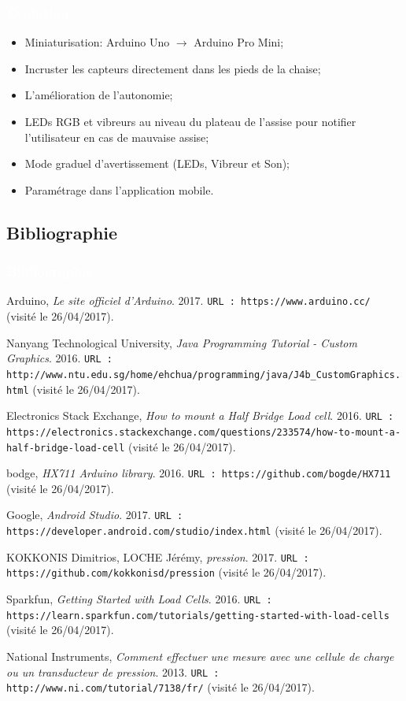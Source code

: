 \documentclass{beamer}
\begin{document}
\begin{frame}
\frametitle{\textcolor{white}{\'Evolution}}
\begin{itemize}
\item Miniaturisation: Arduino Uno $\rightarrow$ Arduino Pro Mini;
\item Incruster les capteurs directement dans les pieds de la chaise;
\item L'amélioration de l'autonomie;
\item LEDs RGB et vibreurs au niveau du plateau de l'assise pour notifier l'utilisateur en cas de mauvaise assise;
\item Mode graduel d'avertissement (LEDs, Vibreur et Son);
\item Paramétrage dans l'application mobile.
\end{itemize}
\end{frame}

\subsection*{Bibliographie}
\begin{frame}
\frametitle{\textcolor{white}{Bibliographie}}
\begin{thebibliography}{99}
{\tiny {} Arduino, \textit{Le site officiel d'Arduino}. 2017. \texttt{\tiny URL : https://www.arduino.cc/} (visité le 26/04/2017).

 Nanyang Technological University, \textit{Java Programming Tutorial - Custom Graphics}. 2016. \texttt{\tiny URL : http://www.ntu.edu.sg/home/ehchua/programming/java/J4b\_CustomGraphics.html} (visité le 26/04/2017).

 Electronics Stack Exchange, \textit{How to mount a Half Bridge Load cell}. 2016. \texttt{\tiny URL : https://electronics.stackexchange.com/questions/233574/how-to-mount-a-half-bridge-load-cell} (visité le 26/04/2017).

 bodge, \textit{HX711 Arduino library}. 2016. \texttt{\tiny URL : https://github.com/bogde/HX711} (visité le 26/04/2017).

 Google, \textit{Android Studio}. 2017. \texttt{\tiny URL : https://developer.android.com/studio/index.html} (visité le 26/04/2017).

 KOKKONIS Dimitrios, LOCHE Jérémy, \textit{pression}. 2017. \texttt{\tiny URL : https://github.com/kokkonisd/pression} (visité le 26/04/2017).

 Sparkfun, \textit{Getting Started with Load Cells}. 2016. \texttt{\tiny URL : https://learn.sparkfun.com/tutorials/getting-started-with-load-cells} (visité le 26/04/2017).

 National Instruments, \textit{Comment effectuer une mesure avec une cellule de charge ou un transducteur de pression}. 2013. \texttt{\tiny URL : http://www.ni.com/tutorial/7138/fr/} (visité le 26/04/2017).}
\end{thebibliography}
\end{frame}
\end{document}
